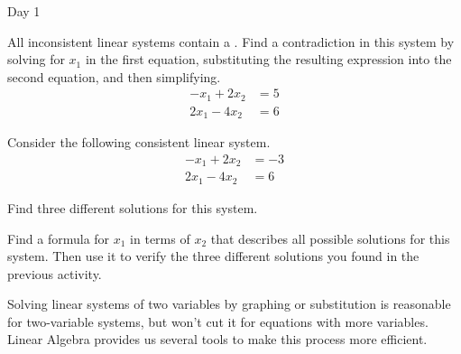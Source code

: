 \begin{applicationActivities}{Day 1}
\begin{activity}
  All inconsistent linear systems contain a .
  Find a contradiction in this system by solving for \(x_1\) in the first
  equation, substituting the resulting expression into the
  second equation, and then simplifying.
  \begin{align*}
  -x_1+2x_2  &=  5 \\
  2x_1-4x_2  &=  6
  \end{align*}
\end{activity}

\begin{activity}
  Consider the following consistent linear system.
  \begin{align*}
  -x_1+2x_2  &= -3 \\
  2x_1-4x_2  &=  6
  \end{align*}
\begin{subactivity}
  Find three different solutions for this system.
\end{subactivity}
\begin{subactivity}
  Find a formula for \(x_1\) in terms of \(x_2\) that describes all possible
  solutions for this system. Then use it to
  verify the three different solutions you found in the previous activity.
\end{subactivity}
\end{activity}

\begin{observation}
  Solving linear systems of two variables by graphing or substitution is
  reasonable for two-variable systems, but won't cut it for equations with
  more variables. Linear Algebra provides us several tools to make this
  process more efficient.
\end{observation}


\end{applicationActivities}
